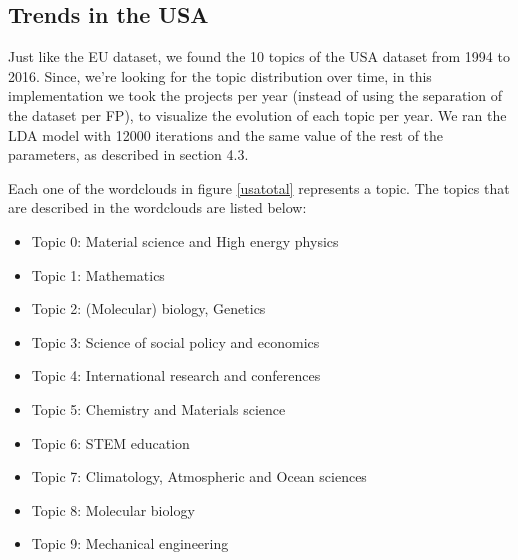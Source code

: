 \documentclass[12pt]{report}
\begin{document}
\subsection{Trends in the USA}
\label{usaevolution}
Just like the EU dataset, we found the 10 topics of the USA dataset
from 1994 to 2016. Since, we're looking for the topic distribution
over time, in this implementation we took the projects per year
(instead of using the separation of the dataset per FP), to visualize
the evolution of each topic per year. We ran the LDA model with 12000
iterations and the same value of the rest of the
parameters, as described in section 4.3. 

Each one of the wordclouds in figure \ref{usatotal} represents a topic.
The topics that are described in the wordclouds are listed below:

\begin{itemize}
\item[] Topic 0: Material science and High energy physics
\item[] Topic 1: Mathematics
\item[] Topic 2: (Molecular) biology, Genetics
\item[] Topic 3: Science of social policy and economics
\item[] Topic 4: International research and conferences
\item[] Topic 5: Chemistry and Materials science
\item[] Topic 6: STEM education
\item[] Topic 7: Climatology, Atmospheric and Ocean sciences
\item[] Topic 8: Molecular biology 
\item[] Topic 9: Mechanical engineering
\end{itemize}
\end{document}
